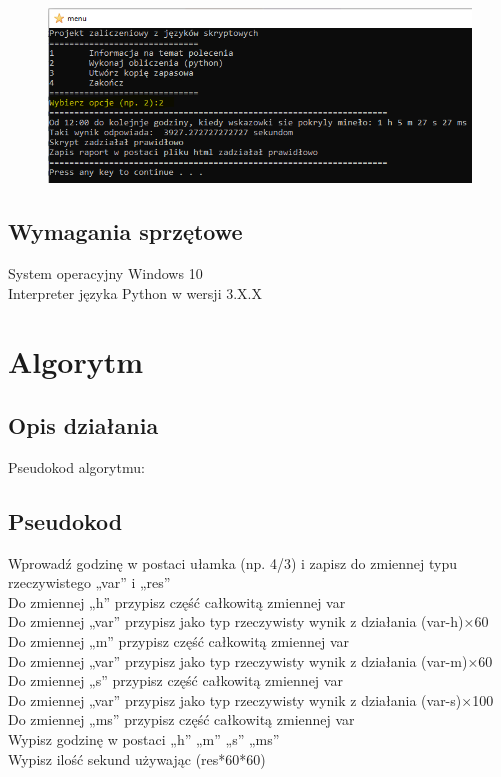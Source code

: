 \documentclass[12pt,a4paper]{article}
\begin{document}
	\begin{figure}[!htb]
	    \centering
	    \includegraphics{menucmd.PNG}
	\end{figure}
	\newpage
	
	
	
	\subsection{Wymagania sprzętowe}
	System operacyjny Windows 10\\
	Interpreter języka Python w wersji 3.X.X
	\newpage
	\section{Algorytm}
	\subsection*{Opis działania} 
	
	Pseudokod algorytmu:
    \subsection{Pseudokod}
    \begin{algorithm}
        	Wprowadź godzinę w postaci ułamka (np. 4/3)  i zapisz do zmiennej typu rzeczywistego „var” i „res”\\
        	Do zmiennej „h” przypisz  część całkowitą zmiennej var\\
        	Do zmiennej „var” przypisz jako typ rzeczywisty wynik z działania (var-h)×60\\
        	Do zmiennej „m” przypisz część całkowitą zmiennej var\\
        	Do zmiennej „var” przypisz jako typ rzeczywisty wynik z działania (var-m)×60\\
        	Do zmiennej „s” przypisz część całkowitą zmiennej var\\
        	Do zmiennej „var” przypisz jako typ rzeczywisty wynik z działania (var-s)×100\\
        	Do zmiennej „ms” przypisz część całkowitą zmiennej var\\
        	Wypisz godzinę w postaci „h” „m” „s” „ms”\\
        	Wypisz ilość sekund używając (res*60*60)
    \end{algorithm}
\end{document}
